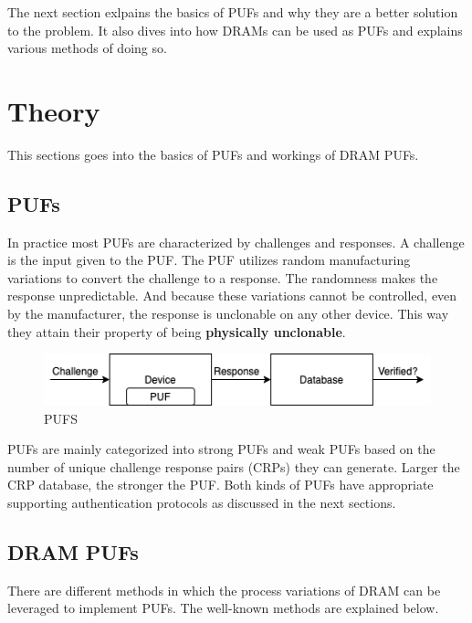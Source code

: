 \documentclass[journal, a4paper]{IEEEtran}
\begin{document}
The next section exlpains the basics of PUFs and why they are a better solution to the problem. It also dives into how DRAMs can be used as PUFs and explains various methods of doing so.

\section{Theory}
This sections goes into the basics of PUFs and workings of DRAM PUFs.
\vspace{-0.9em}
\subsection{PUFs}

In practice most PUFs are characterized by challenges and responses. A challenge is the input given to the PUF. The PUF utilizes random manufacturing variations to convert the challenge to a response. The randomness makes the response unpredictable. And because these variations cannot be controlled, even by the manufacturer, the response is unclonable on any other device. This way they attain their property of being \textbf{physically unclonable}.

\begin{figure}[!hbt]
    \centering
    \includegraphics[scale=0.5]{figs/PUF.png}
    \setlength{\belowcaptionskip}{-10pt}
    \caption{PUFS}
    \label{fig:tf_plot}

\end{figure}

PUFs are mainly categorized into strong PUFs and weak PUFs based on the number of unique challenge response pairs (CRPs) they can generate. Larger the CRP database, the stronger the PUF. Both kinds of PUFs have appropriate supporting authentication protocols as discussed in the next sections.

\vspace{-0.9em}

\subsection{DRAM PUFs}
There are different methods in which the process variations of DRAM can be leveraged to implement PUFs. The well-known methods are explained below.
\end{document}
